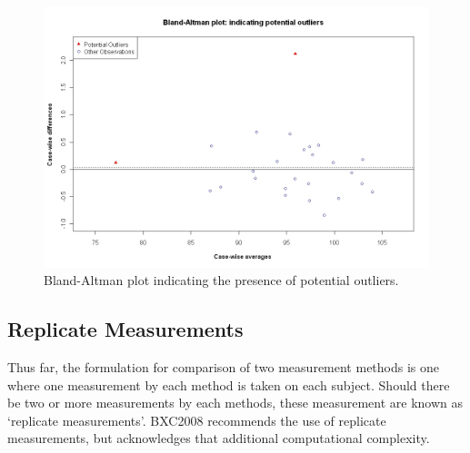 \documentclass[compress]{beamer}        %
\begin{document}
\begin{frame}
\begin{figure}[h!]
\begin{center}
  \includegraphics[width=125mm]{BAOutliers.jpeg}
  \caption{Bland-Altman plot indicating the presence of potential outliers.}\label{Outliers}
\end{center}
\end{figure}

\end{frame}
\subsection{Replicate Measurements}
\begin{frame}


Thus far, the formulation for comparison of two measurement
methods is one where one measurement by each method is taken on
each subject. Should there be two or more measurements by each
methods, these measurement are known as `replicate measurements'.
\alert{BXC2008} recommends the use of replicate measurements, but
acknowledges that  additional computational complexity.
\end{frame}
\end{document}
